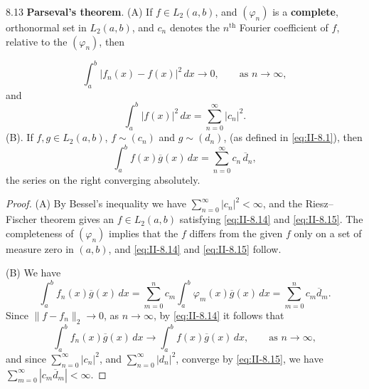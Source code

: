 \begin{nstmt}{8.13}\label{eq:II-8.13}
\textbf{Parseval's theorem}. (A) If $f\in L_{2}(a,b)$, and $(\varphi_{n})$ is a \textbf{complete}, orthonormal set in $L_{2}(a,b)$, and $c_{n}$ denotes the $n^{\text{th}}$ Fourier coefficient of $f$, relative to the $(\varphi_{n})$, then
\end{nstmt}
\begin{equation}\tag{8.14}\label{eq:II-8.14}
\int_{a}^{b}|f_{n}(x)-f(x)|^{2}\,dx\to 0,\qquad\text{as }n\to\infty,
\end{equation}
and
\begin{equation}\tag{8.15}\label{eq:II-8.15}
\int_{a}^{b}|f(x)|^{2}\,dx=\sum_{n=0}^{\infty}|c_{n}|^{2}.
\end{equation}
(B). If $f,g\in L_{2}(a,b)$, $f\sim(c_{n})$ and $g\sim(d_{n})$, (as defined in \eqref{eq:II-8.1}), then
\[
\int_{a}^{b}f(x)\overline{g}(x)\,dx
=\sum_{n=0}^{\infty}c_{n}\,\overline{d}_{n},
\]
the series on the right converging absolutely.
\begin{proof}
(A) By Bessel's inequality we have $\sum_{n=0}^{\infty}|c_{n}|^{2}<\infty$, and the Riesz--Fischer theorem gives an $f\in L_{2}(a,b)$ satisfying \eqref{eq:II-8.14} and \eqref{eq:II-8.15}. The completeness of $(\varphi_{n})$ implies that the $f$ differs from the given $f$ only on a set of measure zero in $(a,b)$, and \eqref{eq:II-8.14} and \eqref{eq:II-8.15} follow.

(B) We have
\[
\int_{a}^{b}f_{n}(x)\overline{g}(x)\,dx
=\sum_{m=0}^{n}c_{m}\int_{a}^{b}\varphi_{m}(x)\overline{g}(x)\,dx
=\sum_{m=0}^{n}c_{m}\overline{d}_{m}.
\]
Since $\|f-f_{n}\|_{2}\to 0$, as $n\to\infty$, by \eqref{eq:II-8.14} it follows that
\[
\int_{a}^{b}f_{n}(x)\overline{g}(x)\,dx\to\int_{a}^{b}f(x)\overline{g}(x)\,dx,\qquad\text{as }n\to\infty,
\]
and since $\sum_{n=0}^{\infty}|c_{n}|^{2}$, and $\sum_{n=0}^{\infty}|d_{n}|^{2}$, converge by \eqref{eq:II-8.15}, we have $\sum_{m=0}^{\infty}|c_{m}\overline{d}_{m}|<\infty$.
\end{proof}

